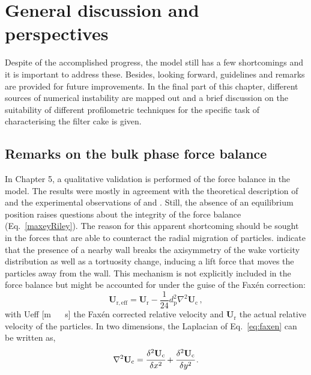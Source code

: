 \hyphenation{}
\chapter[General discussion and perspectives]%
{General discussion and perspectives\label{ch:disc}}

Despite of the accomplished progress, the model still has a few shortcomings and it is important to address these. Besides, looking forward, guidelines and remarks are provided for future improvements. In the final part of this chapter, different sources of numerical instability are mapped out and a brief discussion on the suitability of different profilometric techniques for the specific task of characterising the filter cake is given.
\section{Remarks on the bulk phase force balance \label{sec:discValidation}}
In Chapter 5, a qualitative validation is performed of the force balance in the model. The results were mostly in agreement with the theoretical description of \cite{Matas2004} and the experimental observations of \cite{segre1962} and \cite{DiCarlo2007}. Still, the absence of an equilibrium position raises questions about the integrity of the force balance (Eq.\ \eqref{maxeyRiley}). The reason for this apparent shortcoming should be sought in the forces that are able to counteract the radial migration of particles. \cite{Zeng2005} indicate that the presence of a nearby wall breaks the axisymmetry of the wake vorticity distribution as well as a tortuosity change, inducing a lift force that moves the particles away from the wall. This mechanism is not explicitly included in the force balance but might be accounted for under the guise of the Fax\'en correction:
\begin{equation}
 \mathbf{U}_\mathrm{r,eff} = \mathbf{U}_\mathrm{r} - \frac{1}{24}d_\mathrm{p}^2 \nabla^2 \mathbf{U}_\mathrm{c} \, ,
 \label{eq:faxen}
\end{equation}
with \gls{Ueff} [\unit{\metre\,\reciprocal\second}] the Fax\'en corrected relative velocity and $\mathbf{U}_\mathrm{r}$ the actual relative velocity of the particles.
In two dimensions, the Laplacian of Eq.\ \eqref{eq:faxen} can be written as,
\begin{equation}
 \nabla^2 \mathbf{U}_\mathrm{c}= \cfrac{\delta^2 \mathbf{U}_\mathrm{c}}{\delta x^2}+\cfrac{\delta^2 \mathbf{U}_\mathrm{c}}{\delta y^2} \, .
\end{equation}
